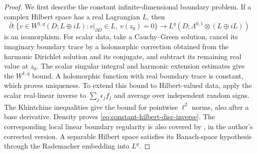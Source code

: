 \documentclass[11pt]{amsart}
\theoremstyle{definition}
\theoremstyle{remark}
\theoremstyle{plain}
\begin{document}
\begin{proof}
We first describe the constant infinite-dimensional boundary problem.
If a complex Hilbert space has a real Lagrangian $L$, then
\begin{equation}\label{eq:constant-hilbert-disc-inverse}
 \bar\partial:
 \{v\in W^{1,q}(D;L\oplus iL):v|_{\partial D}\in L,
                                      \ v(z_0)=0\}
 \longrightarrow L^q(D;\Lambda^{0,1}\otimes(L\oplus iL))
\end{equation}
is an isomorphism. For scalar data, take a Cauchy--Green solution,
cancel its imaginary boundary trace by a holomorphic correction
obtained from the harmonic Dirichlet solution and its conjugate,
and subtract its remaining real value at $z_0$. The scalar singular
integral and harmonic extension estimates give the $W^{1,q}$
bound. A holomorphic function with real boundary trace is constant,
which proves uniqueness. To extend this bound to Hilbert-valued
data, apply the scalar real-linear inverse to
$\sum_j\epsilon_j f_j$ and average over independent random signs.
The Khintchine inequalities give the bound for pointwise $\ell^2$
norms, also after a base derivative. Density proves
\eqref{eq:constant-hilbert-disc-inverse}.
The corresponding local linear boundary regularity is also covered
by \cite[Theorem~1.3 and Corollary~1.4]{Wehrheim04}, in the author's
corrected version. A separable Hilbert space satisfies its Banach-space
hypothesis through the Rademacher embedding into $L^q$.


\end{proof}
\end{document}

